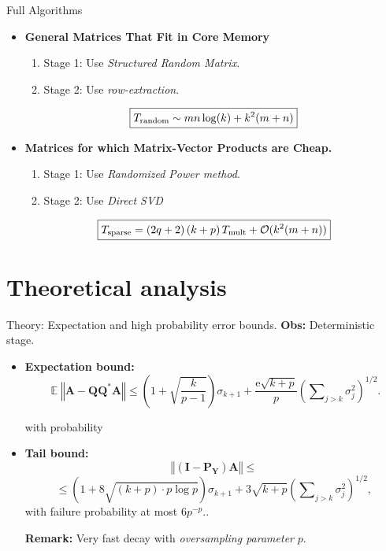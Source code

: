 \documentclass{beamer}
\newcommand{\Expect}{\operatorname{\mathbb{E}}}
\newcommand{\norm}[1]{\left\Vert {#1} \right\Vert}
\newcommand{\mtx}[1]{\bm{#1}}
\newcommand{\adj}{*}
\newcommand{\econst}{\mathrm{e}}
\newcommand{\Id}{\mathbf{I}}
\begin{document}
\begin{frame}{Full Algorithms}
\begin{itemize}
  \item \textbf{General Matrices That Fit in Core Memory}
  \begin{enumerate}
    \item Stage 1: Use \textit{Structured Random Matrix}.
    \item Stage 2: Use \textit{row-extraction}.
  \end{enumerate}

  $$ \boxed{T_{\rm random} \sim mn \log(k) + k^2 (m+n)} $$
  
  \item \textbf{Matrices for which Matrix-Vector Products are Cheap.}
  \begin{enumerate}
    \item Stage 1: Use \textit{Randomized Power method}.
    \item Stage 2: Use \textit{Direct SVD}
  \end{enumerate}

  $$ \boxed{T_{\rm sparse} = (2q+2)\,(k + p) \, T_{\rm mult} + \mathcal{O}(k^2 (m + n))} $$
\end{itemize}
\end{frame}

\section{Theoretical analysis}
\begin{frame}{Theory: Expectation and high probability error bounds.}
\textbf{Obs:} Deterministic stage.
\begin{itemize}
  \item \textbf{Expectation bound:}
  $$
\Expect \norm{\mtx{A}-\mtx{Q}\mtx{Q}^\adj\mtx{A}}
    \leq \left(1 + \sqrt{\frac{k}{p-1}} \right) \sigma_{k+1}
        + \frac{\econst\sqrt{k+p}}{p}
        \left(\sum\nolimits_{j>k} \sigma_{j}^2 \right)^{1/2}.$$

  with probability 
  \item \textbf{Tail bound:}
  $$
\norm{ (\Id - \mtx{P}_{\mtx{Y}}) \mtx{A} } \leq $$
    $$\leq \left( 1 + 8 \sqrt{(k + p) \cdot p \log p} \right) \sigma_{k+1}
        + 3 \sqrt{k+p} \left( \sum\nolimits_{j > k} \sigma_j^2 \right)^{1/2},
$$
with failure probability at most $6 p^{-p}$..

\textbf{Remark:} Very fast decay with \textit{oversampling parameter} $p$.
\end{itemize}
\end{frame}
\end{document}
